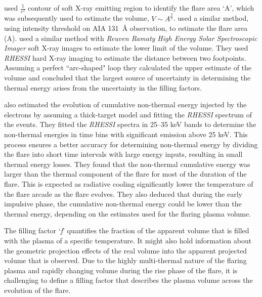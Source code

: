 \cite{li23} used $\frac{1}{e^{2}}$ contour of soft X-ray emitting region to identify the flare area `A', which was subsequently used to estimate the volume, $V\sim A^{\frac{3}{2}}$. \cite{zhang19} used a similar method, using intensity threshold on AIA 131~{\AA} observation, to estimate the flare area (A). \cite{hilarie05} used a similar method with {\it Reuven Ramaty High Energy Solar Spectroscopic Imager} \citep[{\it RHESSI},][]{rhessi} soft X-ray images to estimate the lower limit of the volume. They used {\it RHESSI} hard X-ray imaging to estimate the distance between two footpoints. Assuming a perfect ``arc-shaped" loop they calculated the upper estimate of the volume and concluded that the largest source of uncertainty in determining the thermal energy arises from the uncertainty in the filling factors.

\cite{hilarie05} also estimated the evolution of cumulative non-thermal energy injected by the electrons by assuming a thick-target model \citep{brown71} and fitting the {\it RHESSI} spectrum of the events. They fitted the {\it RHESSI} spectra in 25{--}35 keV bands to determine the non-thermal energies in time bins with significant emission above 25 keV. This process ensures a better accuracy for determining non-thermal energy by dividing the flare into short time intervals with large energy inputs, resulting in small thermal energy losses. They found that the non-thermal cumulative energy was larger than the thermal component of the flare for most of the duration of the flare. This is expected as radiative cooling significantly lower the temperature of the flare arcade as the flare evolves. They also deduced that during the early impulsive phase, the cumulative non-thermal energy could be lower than the thermal energy, depending on the estimates used for the flaring plasma volume. 

The filling factor `\textit{f}' quantifies the fraction of the apparent volume that is filled with the plasma of a specific temperature. It might also hold information about the geometric projection effects of the real volume into the apparent projected volume that is observed. Due to the highly multi-thermal nature of the flaring plasma and rapidly changing volume during the rise phase of the flare, it is challenging to define a filling factor that describes the plasma volume across the evolution of the flare. %

